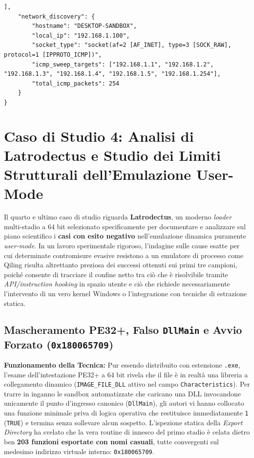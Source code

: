 \documentclass[11pt, a4paper]{article}
\begin{document}
\begin{lstlisting}[style=consoleout, caption={Report telemetrico JSON generato al termine dell'emulazione di Astaroth (astaroth\_report.json).}, label={lst:astaroth_json}]
    ],
    "network_discovery": {
        "hostname": "DESKTOP-SANDBOX",
        "local_ip": "192.168.1.100",
        "socket_type": "socket(af=2 [AF_INET], type=3 [SOCK_RAW], protocol=1 [IPPROTO_ICMP])",
        "icmp_sweep_targets": ["192.168.1.1", "192.168.1.2", "192.168.1.3", "192.168.1.4", "192.168.1.5", "192.168.1.254"],
        "total_icmp_packets": 254
    }
}
\end{lstlisting}

\section{Caso di Studio 4: Analisi di Latrodectus e Studio dei Limiti Strutturali dell'Emulazione User-Mode}

Il quarto e ultimo caso di studio riguarda \textbf{Latrodectus}, un moderno \textit{loader} multi-stadio a 64 bit selezionato specificamente per documentare e analizzare sul piano scientifico i \textbf{casi con esito negativo} nell'emulazione dinamica puramente \textit{user-mode}. In un lavoro sperimentale rigoroso, l'indagine sulle cause esatte per cui determinate contromisure evasive resistono a un emulatore di processo come Qiling risulta altrettanto preziosa dei successi ottenuti sui primi tre campioni, poich\'e consente di tracciare il confine netto tra ci\`o che \`e risolvibile tramite \textit{API/instruction hooking} in spazio utente e ci\`o che richiede necessariamente l'intervento di un vero kernel Windows o l'integrazione con tecniche di estrazione statica.

\subsection[Mascheramento PE32+, Falso DllMain ed Entry Point Esportato]{Mascheramento PE32+, Falso \texttt{DllMain} e Avvio Forzato (\texttt{0x180065709})}

\textbf{Funzionamento della Tecnica:} Pur essendo distribuito con estensione \texttt{.exe}, l'esame dell'intestazione PE32+ a 64 bit rivela che il file \`e in realt\`a una libreria a collegamento dinamico (\texttt{IMAGE\_\allowbreak{}FILE\_\allowbreak{}DLL} attivo nel campo \texttt{Characteristics}). Per trarre in inganno le sandbox automatizzate che caricano una DLL invocandone unicamente il punto d'ingresso canonico (\texttt{DllMain}), gli autori vi hanno collocato una funzione minimale priva di logica operativa che restituisce immediatamente \texttt{1} (\texttt{TRUE}) e termina senza sollevare alcun sospetto. L'ispezione statica della \textit{Export Directory} ha svelato che la vera routine di innesco del primo stadio \`e celata dietro ben \textbf{203 funzioni esportate con nomi casuali}, tutte convergenti sul medesimo indirizzo virtuale interno: \texttt{0x180065709}.
\end{document}
